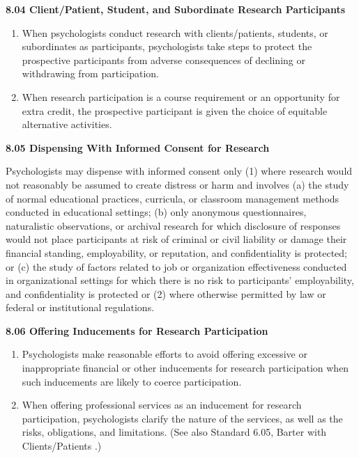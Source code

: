 \documentclass[
]{krantz}
\begin{document}
\textbf{8.04 Client/Patient, Student, and Subordinate Research Participants}

\begin{enumerate}
\def\labelenumi{(\alph{enumi})}
\item
  When psychologists conduct research with clients/patients, students, or subordinates as participants, psychologists take steps to protect the prospective participants from adverse consequences of declining or withdrawing from participation.
\item
  When research participation is a course requirement or an opportunity for extra credit, the prospective participant is given the choice of equitable alternative activities.
\end{enumerate}

\textbf{8.05 Dispensing With Informed Consent for Research}

Psychologists may dispense with informed consent only (1) where research would not reasonably be assumed to create distress or harm and involves (a) the study of normal educational practices, curricula, or classroom management methods conducted in educational settings; (b) only anonymous questionnaires, naturalistic observations, or archival research for which disclosure of responses would not place participants at risk of criminal or civil liability or damage their financial standing, employability, or reputation, and confidentiality is protected; or (c) the study of factors related to job or organization effectiveness conducted in organizational settings for which there is no risk to participants' employability, and confidentiality is protected or (2) where otherwise permitted by law or federal or institutional regulations.

\textbf{8.06 Offering Inducements for Research Participation}

\begin{enumerate}
\def\labelenumi{(\alph{enumi})}
\item
  Psychologists make reasonable efforts to avoid offering excessive or inappropriate financial or other inducements for research participation when such inducements are likely to coerce participation.
\item
  When offering professional services as an inducement for research participation, psychologists clarify the nature of the services, as well as the risks, obligations, and limitations. (See also Standard 6.05, Barter with Clients/Patients .)
\end{enumerate}
\end{document}
